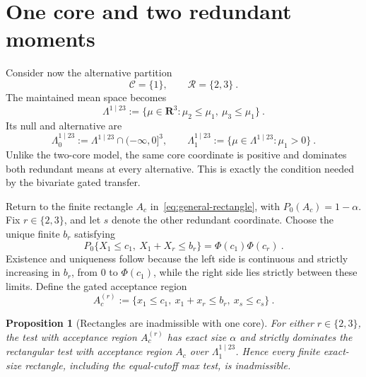\documentclass[12pt]{article}
\newtheorem{proposition}{Proposition}
\theoremstyle{remark}
\begin{document}
\section{One core and two redundant moments}

Consider now the alternative partition
\[
\mathcal C=\{1\},
\qquad
\mathcal R=\{2,3\}~.
\]
The maintained mean space becomes
\begin{equation}\label{eq:one-core-space}
\Lambda^{1\mid23}
:=
\{\mu\in\mathbf R^3:\mu_2\le\mu_1,\ \mu_3\le\mu_1\}~.
\end{equation}
Its null and alternative are
\[
\Lambda^{1\mid23}_0
:=
\Lambda^{1\mid23}\cap(-\infty,0]^3,
\qquad
\Lambda^{1\mid23}_1
:=
\{\mu\in\Lambda^{1\mid23}:\mu_1>0\}~.
\]
Unlike the two-core model, the same core coordinate is positive and dominates
both redundant means at every alternative.  This is exactly the condition
needed by the bivariate gated transfer.

Return to the finite rectangle $A_c$ in~\eqref{eq:general-rectangle}, with
$P_0(A_c)=1-\alpha$.  Fix $r\in\{2,3\}$, and let $s$ denote the other
redundant coordinate.  Choose the unique finite $b_r$ satisfying
\begin{equation}\label{eq:one-core-gate-calibration}
P_0\{X_1\le c_1,\ X_1+X_r\le b_r\}
=
\Phi(c_1)\Phi(c_r)~.
\end{equation}
Existence and uniqueness follow because the left side is continuous and
strictly increasing in $b_r$, from $0$ to $\Phi(c_1)$, while the right side
lies strictly between these limits.
Define the gated acceptance region
\begin{equation}\label{eq:one-core-gated-rectangle}
A_c^{(r)}
:=
\{x_1\le c_1,\ x_1+x_r\le b_r,\ x_s\le c_s\}~.
\end{equation}

\begin{proposition}[Rectangles are inadmissible with one core]
\label{prop:one-core-rectangle-dominated}
For either $r\in\{2,3\}$, the test with acceptance region $A_c^{(r)}$ has
exact size $\alpha$ and strictly dominates the rectangular test with
acceptance region $A_c$ over $\Lambda^{1\mid23}_1$.  Hence every finite
exact-size rectangle, including the equal-cutoff max test, is inadmissible.
\end{proposition}
\end{document}
